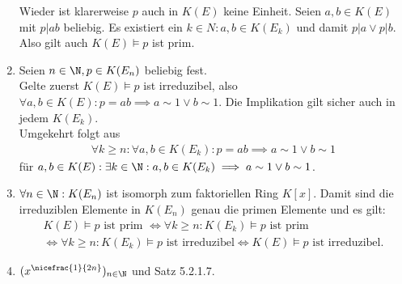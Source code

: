 \begin{solution}
\begin{enumerate}
  Wieder ist klarerweise $p$ auch in $K(E)$ keine Einheit.
  Seien $a,b \in K(E)$ mit $p|ab$ beliebig. Es existiert ein $k \in N: a,b \in K(E_k)$
  und damit $p|a \lor p|b$. Also gilt auch $K(E) \vDash p$ ist prim.
  \item Seien $n \in \N, p \in K(E_n)$ beliebig fest. \\
  Gelte zuerst $K(E) \vDash p$ ist irreduzibel, also
  $\forall a,b \in K(E): p = ab \implies a \sim 1 \lor b \sim 1$.
  Die Implikation gilt sicher auch in jedem $K(E_k)$. \\
  Umgekehrt folgt aus
  \begin{align*}
    \forall k \geq n: \forall a,b \in K(E_k): p = ab \implies a \sim 1 \lor b \sim 1
  \end{align*}
  für $a,b \in K(E): \exists k \in \N: a,b \in K(E_k) \implies a \sim 1 \lor b \sim 1$.
  \item $\forall n \in \N: K(E_n)$ ist isomorph zum faktoriellen Ring $K[x]$. Damit sind
  die irreduziblen Elemente in $K(E_n)$ genau die primen Elemente und es gilt:
  \begin{align*}
    K(E) \vDash p \text{ ist prim } \iff \forall k \geq n: K(E_k) \vDash p \text{ ist prim} \\
    \iff \forall k \geq n: K(E_k) \vDash p \text{ ist irreduzibel}
    \iff K(E) \vDash p \text{ ist irreduzibel}.
  \end{align*}
  \item $(x^{\nicefrac{1}{2n}})_{n \in \N}$ und Satz 5.2.1.7.
\end{enumerate}
\end{solution}
